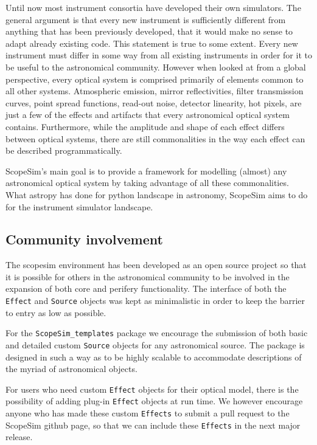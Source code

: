 Until now most instrument consortia have developed their own simulators.
The general argument is that every new instrument is sufficiently different from anything that has been previously developed, that it would make no sense to adapt already existing code.
This statement is true to some extent.
Every new instrument must differ in some way from all existing instruments in order for it to be useful to the astronomical community.
However when looked at from a global perspective, every optical system is comprised primarily of elements common to all other systems.
Atmospheric emission, mirror reflectivities, filter transmission curves, point spread functions, read-out noise, detector linearity, hot pixels, are just a few of the effects and artifacts that every astronomical optical system contains.
Furthermore, while the amplitude and shape of each effect differs between optical systems, there are still commonalities in the way each effect can be described programmatically.

ScopeSim's main goal is to provide a framework for modelling (almost) any astronomical optical system by taking advantage of all these commonalities.
What astropy has done for python landscape in astronomy, ScopeSim aims to do for the instrument simulator landscape.


\subsection{Community involvement%
  \label{community-involvement}%
}

The scopesim environment has been developed as an open source project so that it is possible for others in the astronomical community to be involved in the expansion of both core and perifery functionality.
The interface of both the \texttt{Effect} and \texttt{Source} objects was kept as minimalistic in order to keep the barrier to entry as low as possible.

For the \texttt{ScopeSim\_templates} package we encourage the submission of both basic and detailed custom \texttt{Source} objects for any astronomical source.
The package is designed in such a way as to be highly scalable to accommodate descriptions of the myriad of astronomical objects.

For users who need custom \texttt{Effect} objects for their optical model, there is the possibility of adding \textquotedbl{}plug-in\textquotedbl{} \texttt{Effect} objects at run time.
We however encourage anyone who has made these custom \texttt{Effects} to submit a pull request to the ScopeSim github page, so that we can include these \texttt{Effects} in the next major release.


